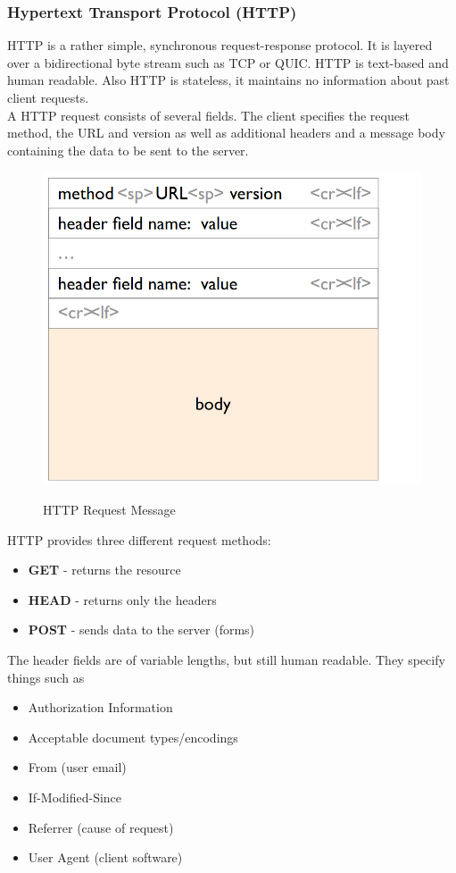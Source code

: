 \subsubsection{Hypertext Transport Protocol (HTTP)}
HTTP is a rather simple, synchronous request-response protocol. It is layered over a bidirectional byte stream such as TCP or QUIC. HTTP is text-based and human readable. Also HTTP is stateless, it maintains no information about past client requests.\vspace{.3cm}\\
A HTTP request consists of several fields. The client specifies the request method, the URL and version as well as additional headers and a message body containing the data to be sent to the server.
\begin{figure}[H]
\centering
\includegraphics[width=.5\textwidth]{images/http-request.PNG}
\label{http_request}
\caption{HTTP Request Message}
\end{figure}
HTTP provides three different request methods:
\begin{itemize}
\item \textbf{GET} - returns the resource
\item \textbf{HEAD} - returns only the headers
\item \textbf{POST} - sends data to the server (forms)
\end{itemize}
The header fields are of variable lengths, but still human readable. They specify things such as
\begin{itemize}
\item Authorization Information
\item Acceptable document types/encodings
\item From (user email)
\item If-Modified-Since
\item Referrer (cause of request)
\item User Agent (client software)
\end{itemize}

